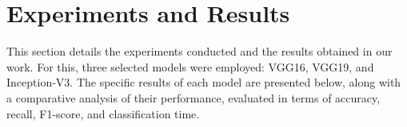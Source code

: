 \section{Experiments and Results}

This section details the experiments conducted and the results obtained in our work. For this, three selected models were employed: VGG16, VGG19, and Inception-V3. The specific results of each model are presented below, along with a comparative analysis of their performance, evaluated in terms of accuracy, recall, F1-score, and classification time.



